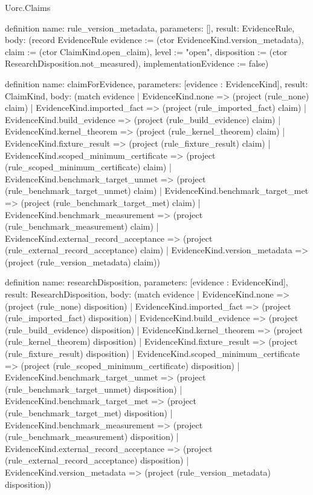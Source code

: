 \begin{lexlean}{Uorc.Claims}
\begin{semanticmodule}
definition{
  name: rule_version_metadata,
  parameters: [],
  result: EvidenceRule,
  body: (record EvidenceRule {evidence := (ctor EvidenceKind.version_metadata), claim := (ctor ClaimKind.open_claim), level := "open", disposition := (ctor ResearchDisposition.not_measured), implementationEvidence := false})
}

definition{
  name: claimForEvidence,
  parameters: [evidence : EvidenceKind],
  result: ClaimKind,
  body: (match evidence
    | EvidenceKind.none => (project (rule_none) claim)
    | EvidenceKind.imported_fact => (project (rule_imported_fact) claim)
    | EvidenceKind.build_evidence => (project (rule_build_evidence) claim)
    | EvidenceKind.kernel_theorem => (project (rule_kernel_theorem) claim)
    | EvidenceKind.fixture_result => (project (rule_fixture_result) claim)
    | EvidenceKind.scoped_minimum_certificate => (project (rule_scoped_minimum_certificate) claim)
    | EvidenceKind.benchmark_target_unmet => (project (rule_benchmark_target_unmet) claim)
    | EvidenceKind.benchmark_target_met => (project (rule_benchmark_target_met) claim)
    | EvidenceKind.benchmark_measurement => (project (rule_benchmark_measurement) claim)
    | EvidenceKind.external_record_acceptance => (project (rule_external_record_acceptance) claim)
    | EvidenceKind.version_metadata => (project (rule_version_metadata) claim))
}

definition{
  name: researchDisposition,
  parameters: [evidence : EvidenceKind],
  result: ResearchDisposition,
  body: (match evidence
    | EvidenceKind.none => (project (rule_none) disposition)
    | EvidenceKind.imported_fact => (project (rule_imported_fact) disposition)
    | EvidenceKind.build_evidence => (project (rule_build_evidence) disposition)
    | EvidenceKind.kernel_theorem => (project (rule_kernel_theorem) disposition)
    | EvidenceKind.fixture_result => (project (rule_fixture_result) disposition)
    | EvidenceKind.scoped_minimum_certificate => (project (rule_scoped_minimum_certificate) disposition)
    | EvidenceKind.benchmark_target_unmet => (project (rule_benchmark_target_unmet) disposition)
    | EvidenceKind.benchmark_target_met => (project (rule_benchmark_target_met) disposition)
    | EvidenceKind.benchmark_measurement => (project (rule_benchmark_measurement) disposition)
    | EvidenceKind.external_record_acceptance => (project (rule_external_record_acceptance) disposition)
    | EvidenceKind.version_metadata => (project (rule_version_metadata) disposition))
}


\end{semanticmodule}
\end{lexlean}

